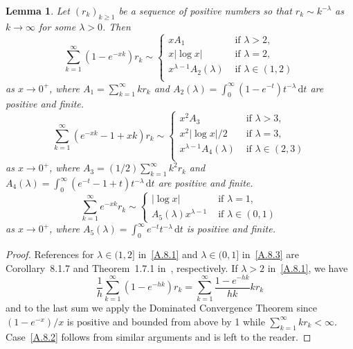 \documentclass[10pt]{amsart}
\newtheorem{lemm}[theo]{Lemma}\newtheorem{prop}[theo]{Proposition}\newtheorem{coro}[theo]{Corollary}\newtheorem{conj}[theo]{Conjecture}
\theoremstyle{definition}\newtheorem{defi}[theo]{Definition}\newtheorem{rema}[theo]{Remark}\newtheorem{exam}[theo]{Example}\newtheorem{exem}[theo]{Example}\newtheorem{nota}[theo]{Notation}
\newcommand{\gl}{\lambda}
\newcommand{\dd}{\mathrm{d}}
\begin{document}
\pagebreak
\begin{lemm}\label{seriesAsymptotics}
Let $(r_k)_{k\ge1}$ be a sequence of positive numbers so that $r_k\sim k^{-\gl}$ as $k\to\infty$ for some $\gl>0$. Then
\begin{equation} \tag{i} \label{A.8.1}
\sum_{k=1}^\infty (1-e^{-xk})r _k\sim
\begin{cases} x A_1& \text{ if } \gl>2, \\
x |{\log x}| & \text{ if } \gl=2, \\
x^{\gl-1}A_2(\gl) & \text{ if } \gl\in(1, 2) \\
\end{cases}
\end{equation}
as $x\to 0^+$, where $A_1=\sum_{k=1}^\infty k r_k$ and $A_2(\gl)=\int_0^\infty (1-e^{-t}) t^{-\gl}\, \dd t$ are positive and finite.
\begin{equation} \tag{ii} \label{A.8.2}
\sum_{k=1}^\infty (e^{-xk}-1+xk) r_k\sim
\begin{cases} x^2 A_3& \text{ if } \gl>3, \\
x^2|{\log x}|/2 & \text{ if } \gl=3, \\
x^{\gl-1}A_4(\gl) & \text{ if } \gl\in(2, 3) \\
\end{cases}
\end{equation}
as $x\to 0^+$, where $A_3=(1/2)\sum_{k=1}^\infty k^2 r_k$ and $A_4(\gl)=\int_0^\infty (e^{-t}-1+t) t^{-\gl}\, \dd t$ are positive and finite.
\begin{equation} \tag{iii} \label{A.8.3}
\sum_{k=1}^\infty e^{-xk} r_k \sim
\begin{cases}
|{\log x}| & \text{ if } \gl = 1,\\[2pt] A_5(\gl) x^{\gl-1}& \text{ if } \gl \in (0,1)
\end{cases}
\end{equation}
as $x\to 0^+$, where $A_5(\gl)=\int_0^\infty e^{-t}t^{-\gl}\, \dd t$ is positive and finite.
\end{lemm}

\begin{proof}
References for $\gl\in (1,2]$ in~\eqref{A.8.1} and $\gl\in(0,1]$ in~\eqref{A.8.3} are Corollary~8.1.7 and Theorem~1.7.1 in~\cite{BGT89}, respectively. If $\gl>2$ in~\eqref{A.8.1}, we have
\[
\frac{1}{h}\sum_{k=1}^\infty (1-e^{-hk}) r_k=\sum_{k=1}^\infty \frac{1-e^{-hk}}{hk} k r_k
\]
and to the last sum we apply the Dominated Convergence Theorem since $(1-e^{-x})/x$ is positive and bounded from above by 1 while $\sum_{k=1}^\infty k r_k<\infty$. Case~\eqref{A.8.2} follows from similar arguments and is left to the reader.
\end{proof}
\end{document}
